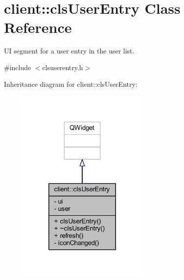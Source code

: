 \hypertarget{classclient_1_1cls_user_entry}{\section{client\-:\-:cls\-User\-Entry Class Reference}
\label{d0/ddb/classclient_1_1cls_user_entry}
}


U\-I segment for a user entry in the user list.  




{\ttfamily \#include $<$clsuserentry.\-h$>$}



Inheritance diagram for client\-:\-:cls\-User\-Entry\-:\nopagebreak
\begin{figure}[H]
\begin{center}
\leavevmode
\includegraphics[width=180pt]{d1/d97/classclient_1_1cls_user_entry__inherit__graph}
\end{center}
\end{figure}


